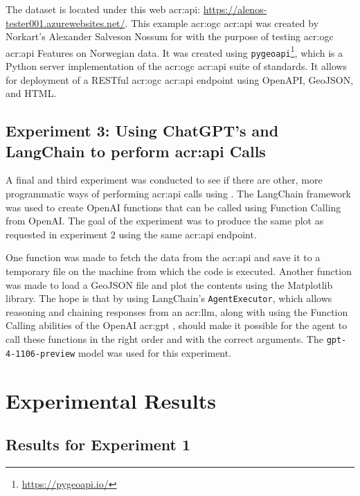 The dataset is located under this web \acrshort{acr:api}: \url{https://alenos-tester001.azurewebsites.net/}. This example \acrshort{acr:ogc} \acrshort{acr:api} was created by Norkart's Alexander Salveson Nossum for with the purpose of testing \acrshort{acr:ogc} \acrshort{acr:api} Features on Norwegian data. It was created using \texttt{pygeoapi}\footnote{\url{https://pygeoapi.io/}}, which is a Python server implementation of the \acrshort{acr:ogc} \acrshort{acr:api} suite of standards. It allows for deployment of a RESTful \acrshort{acr:ogc} \acrshort{acr:api} endpoint using OpenAPI, GeoJSON, and HTML.

\subsection[Experiment 3: Using ChatGPT's and LangChain to perform API Call]{Experiment 3: Using ChatGPT's and LangChain to perform \acrshort{acr:api} Calls}

A final and third experiment was conducted to see if there are other, more programmatic ways of performing \acrshort{acr:api} calls using . The LangChain framework \citep{chaseLangChain2022} was used to create OpenAI functions that can be called using Function Calling from OpenAI. The goal of the experiment was to produce the same plot as requested in experiment 2 using the same \acrshort{acr:api} endpoint.

One function was made to fetch the data from the \acrshort{acr:api} and save it to a temporary file on the machine from which the code is executed. Another function was made to load a GeoJSON file and plot the contents using the Matplotlib library. The hope is that by using LangChain's \texttt{AgentExecutor}, which allows reasoning and chaining responses from an \acrshort{acr:llm}, along with using the Function Calling abilities of the OpenAI \acrshort{acr:gpt} , should make it possible for the agent to call these functions in the right order and with the correct arguments. The \texttt{gpt-4-1106-preview} model was used for this experiment.

\section{Experimental Results}\label{sec:experimental-results}

\subsection{Results for Experiment 1}\label{subsec:experiment-1-results}

